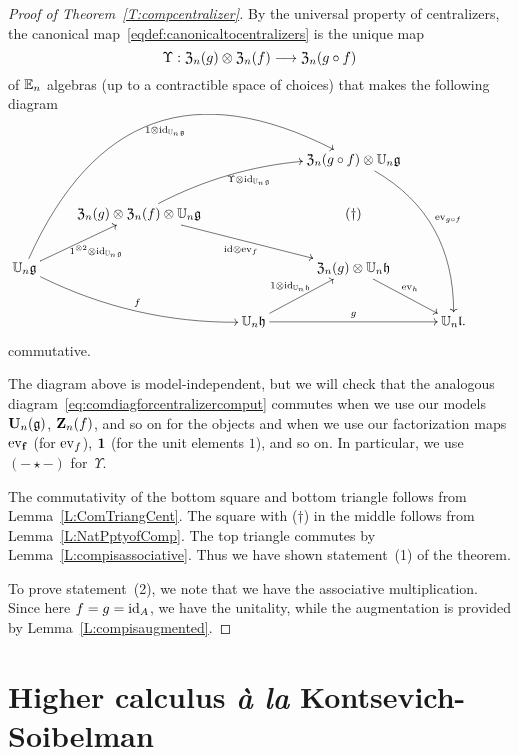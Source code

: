 \documentclass[11pt]{amsart}
\numberwithin{equation}{section}
\begin{document}
\begin{proof}[Proof of Theorem~\ref{T:compcentralizer}]
By the universal property of centralizers, 
the canonical map~\eqref{eqdef:canonicaltocentralizers} is the unique map 
\[ 
\Upsilon: {\frak Z}_n(g) \otimes {\frak Z}_n(f) \longrightarrow {\frak Z}_n(g\circ f)
\] 
of $\mathbb E_n$ algebras (up to a contractible space of choices) that makes the following diagram
\begin{equation}
\label{eq:comdiagforcentralizercomput}
\xymatrix{
&   &&  
{\frak Z}_n(g\circ f) \otimes  \UU_n \fg  \ar@/^{2pc}/[dddr]^{\ev_{g\circ f}}\\
&{\frak Z}_n(g) \otimes  {\frak Z}_n(f) \otimes \UU_n \fg \ar@/^{1pc}/[rru]_{ \Upsilon \otimes \id_{\UU_n \fg}} \ar[rrd]_{\id\otimes \ev_{f}}
&& (\dagger)
& & \\
\UU_n \fg \ar[ur]_{1^{\otimes 2}\otimes \id_{\UU_n \fg}} \ar@/_{1pc}/[rrd]^{f} \ar@/^{6pc}/[rrruu]_{1\otimes \id_{\UU_n \fg}} &&&
{\frak Z}_n(g) \otimes \UU_n \fh \ar[rd]^{\ev_{h}}  &\\
&& \UU_n \fh \ar[rr]^{g} \ar[ur]^{1\otimes \id_{\UU_n \fh}} && \UU_n \fl .
}
\end{equation}
commutative.

The diagram above is model-independent,
but we will check that the analogous diagram~\eqref{eq:comdiagforcentralizercomput} commutes when we use our models $\mathbf U_n (\mathfrak g)$, $\mathbf Z_n(f)$, and so on for the objects and when we use our factorization maps ${\rm ev}_{{\bf f}}$ (for ${\rm ev}_f$), ${\bf 1}$ (for the unit elements $1$),  and so on.
In particular, we use $(-\star-)$ for~$\Upsilon$.

The commutativity of the bottom square and bottom triangle follows from Lemma~\ref{L:ComTriangCent}.
The square with ($\dagger$) in the middle follows from Lemma~\ref{L:NatPptyofComp}.
The top triangle commutes by Lemma~\ref{L:compisassociative}. 
Thus we have shown statement~(1) of the theorem.

To prove statement~(2), we note that we have the associative multiplication.
Since here $f=g={\rm id}_A$, we have the unitality,
while the augmentation is provided by Lemma~\ref{L:compisaugmented}.
\end{proof}

\section{Higher calculus {\it \`a la} Kontsevich-Soibelman}
\label{sec: TT}
\end{document}

